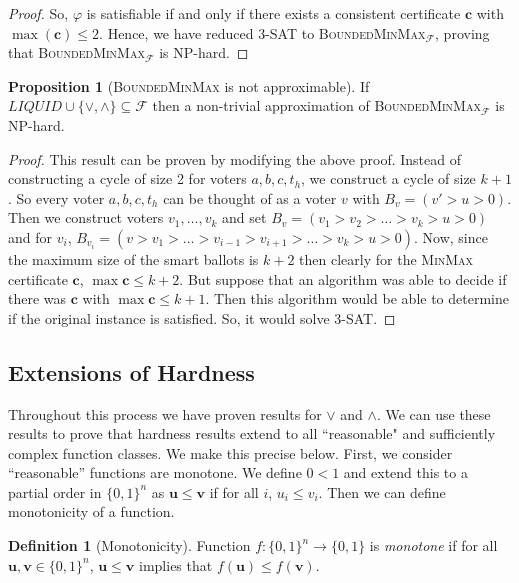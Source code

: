 \documentclass[11pt,a4paper, titlepage]{article}
\theoremstyle{definition}
\newtheorem{definition}[theorem]{Definition}
\newtheorem{proposition}[theorem]{Proposition}
\let\vec\mathbf
\begin{document}
\begin{proof}
    So, $\varphi$ is satisfiable if and only if there exists a consistent certificate $\vec{c}$ with $\max(\vec{c}) \leq 2$. Hence, we have reduced \textsc{3-SAT} to \textsc{BoundedMinMax}$_\mathcal{F}$, proving that \textsc{BoundedMinMax}$_\mathcal{F}$ is NP-hard.
\end{proof}

\begin{proposition}[\textsc{BoundedMinMax} is not approximable]
    If $\mathit{LIQUID} \cup \{\lor, \land\} \subseteq \mathcal{F}$ then a non-trivial approximation of \textsc{BoundedMinMax}$_\mathcal{F}$ is NP-hard.
\end{proposition}

\begin{proof}
    This result can be proven by modifying the above proof. Instead of constructing a cycle of size 2 for voters $a, b, c, t_h$, we construct a cycle of size $k + 1$. So every voter $a, b, c, t_h$ can be thought of as a voter $v$ with $B_v = (v' > u > 0)$. Then we construct voters $v_1, \ldots, v_k$ and set $B_v = (v_1 > v_2 > \ldots > v_k > u > 0)$ and for $v_i$, $B_{v_i} = (v > v_1 > \ldots > v_{i - 1} > v_{i+1} > \ldots > v_k > u > 0)$.
    Now, since the maximum size of the smart ballots is $k + 2$ then clearly for the \textsc{MinMax} certificate $\vec{c}$, $\max{\vec{c}} \leq k + 2$. 
    But suppose that an algorithm was able to decide if there was $\vec{c}$ with $\max{\vec{c}} \leq k + 1$. Then this algorithm would be able to determine if the original instance is satisfied. So, it would solve \textsc{3-SAT}.
\end{proof}

\subsection{Extensions of Hardness}

Throughout this process we have proven results for $\lor$ and $\land$.
We can use these results to prove that hardness results extend to all ``reasonable" and sufficiently complex function classes.
We make this precise below.
First, we consider ``reasonable'' functions are monotone. 
We define $0 < 1$ and extend this to a partial order in $\{0,1\}^n$ as $\vec{u} \leq \vec{v}$ if for all $i$, $u_i \leq v_i$.
Then we can define monotonicity of a function.

\begin{definition}[Monotonicity]
    \label{monotonicity}
    Function $f\colon \{0, 1\}^n \longrightarrow \{0, 1\}$ is \emph{monotone} if for all $\vec{u}, \vec{v} \in \{0,1\}^n$, $\vec{u} \leq \vec{v}$ implies that $f(\vec{u}) \leq f(\vec{v})$.
\end{definition}
\end{document}
